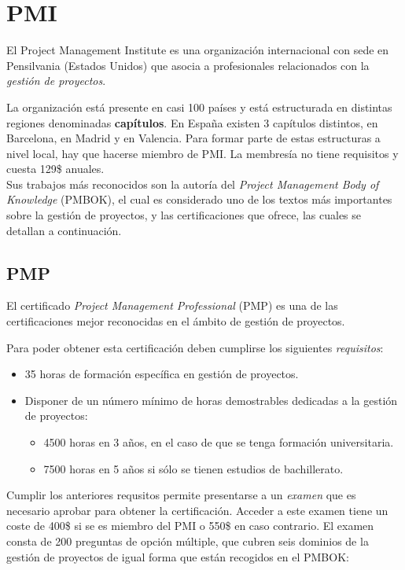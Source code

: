 \section{PMI}

El Project Management Institute es una organización internacional con sede en Pensilvania (Estados Unidos) que asocia a profesionales relacionados con la \emph{gestión de proyectos}.

La organización está presente en casi 100 países y está estructurada en distintas regiones denominadas \textbf{capítulos}. En España existen 3 capítulos distintos, en Barcelona, en Madrid y en Valencia. Para formar parte de estas estructuras a nivel local, hay que hacerse miembro de PMI. La membresía no tiene requisitos y cuesta 129\$ anuales.\\

Sus trabajos más reconocidos son la autoría del \emph{Project Management Body of Knowledge} (PMBOK), el cual es considerado uno de los textos más importantes sobre la gestión de proyectos, y las certificaciones que ofrece, las cuales se detallan a continuación.

\subsection{PMP}

El certificado \emph{Project Management Professional} (PMP) es una de las certificaciones mejor reconocidas en el ámbito de gestión de proyectos.

Para poder obtener esta certificación deben cumplirse los siguientes \emph{requisitos}:

\begin{itemize}
\item 35 horas de formación específica en gestión de proyectos.
\item Disponer de un número mínimo de horas demostrables dedicadas a la gestión de proyectos:
	\begin{itemize}
	\item 4500 horas en 3 años, en el caso de que se tenga formación universitaria.
	\item 7500 horas en 5 años si sólo se tienen estudios de bachillerato.
	\end{itemize} 
\end{itemize}

Cumplir los anteriores requsitos permite presentarse a un \emph{examen} que es necesario aprobar para obtener la certificación. Acceder a este examen tiene un coste de 400\$ si se es miembro del PMI o 550\$ en caso contrario. El examen consta de 200 preguntas de opción múltiple, que cubren seis dominios de la gestión de proyectos de igual forma que están recogidos en el PMBOK:

